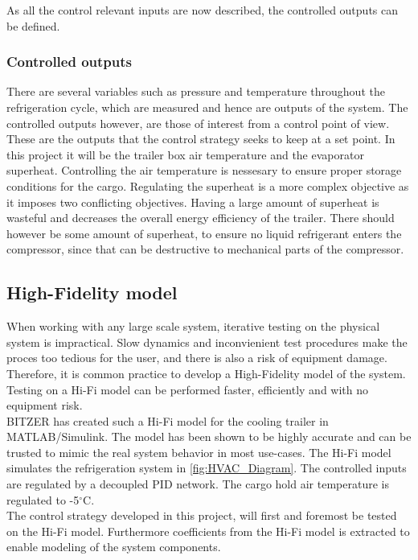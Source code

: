 As all the control relevant inputs are now described, the controlled outputs can be defined. 
\subsubsection{Controlled outputs}
There are several variables such as pressure and temperature throughout the refrigeration cycle, which are measured and hence are outputs of the system. The controlled outputs however, are those of interest from a control point of view. These are the outputs that the control strategy seeks to keep at a set point. In this project it will be the trailer box air temperature and the evaporator superheat. Controlling the air temperature is nessesary to ensure proper storage conditions for the cargo. Regulating the superheat is a more complex objective as it imposes two conflicting objectives. Having a large amount of superheat is wasteful and decreases the overall energy efficiency of the trailer. There should however be some amount of superheat, to ensure no liquid refrigerant enters the compressor, since that can be destructive to mechanical parts of the compressor.\\

\subsection{High-Fidelity model}
When working with any large scale system, iterative testing on the physical system is impractical. Slow dynamics and inconvienient test procedures make the proces too tedious for the user, and there is also a risk of equipment damage. Therefore, it is common practice to develop a High-Fidelity model of the system. Testing on a Hi-Fi model can be performed faster, efficiently and with no equipment risk. \\

BITZER has created such a Hi-Fi model for the cooling trailer in MATLAB/Simulink. The model has been shown to be highly accurate and can be trusted to mimic the real system behavior in most use-cases. The Hi-Fi model simulates the refrigeration system in \cref{fig:HVAC_Diagram}. The controlled inputs are regulated by a decoupled PID network. The cargo hold air temperature is regulated to -5$^{\circ}$C.\\

The control strategy developed in this project, will first and foremost be tested on the Hi-Fi model. Furthermore coefficients from the Hi-Fi model is extracted to enable modeling of the system components.


